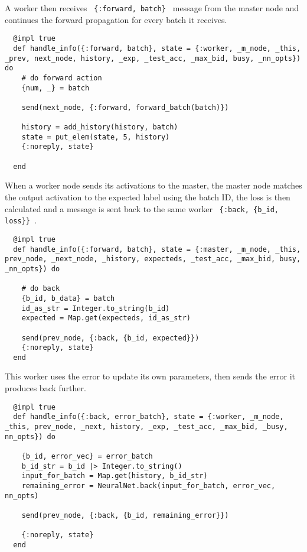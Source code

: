 A worker then receives \lstinline| {:forward, batch} | message from the master
node and continues the forward propagation for every batch it receives.
\begin{lstlisting}
  @impl true
  def handle_info({:forward, batch}, state = {:worker, _m_node, _this, _prev, next_node, history, _exp, _test_acc, _max_bid, busy, _nn_opts}) do
    # do forward action
    {num, _} = batch

    send(next_node, {:forward, forward_batch(batch)})

    history = add_history(history, batch)
    state = put_elem(state, 5, history)
    {:noreply, state}

  end
\end{lstlisting}

When a worker node sends its activations to the master, the master node matches
the output activation to the expected label using the batch ID, the loss is then
calculated and a message is sent back to the same worker \lstinline| {:back, {b_id, loss}} |.
\begin{lstlisting}
  @impl true
  def handle_info({:forward, batch}, state = {:master, _m_node, _this, prev_node, _next_node, _history, expecteds, _test_acc, _max_bid, busy, _nn_opts}) do

    # do back
    {b_id, b_data} = batch
    id_as_str = Integer.to_string(b_id)
    expected = Map.get(expecteds, id_as_str)

    send(prev_node, {:back, {b_id, expected}})
    {:noreply, state}
  end
\end{lstlisting}

This worker uses the error to update its own parameters, then
sends the error it produces back further.
\begin{lstlisting}
  @impl true
  def handle_info({:back, error_batch}, state = {:worker, _m_node, _this, prev_node, _next, history, _exp, _test_acc, _max_bid, _busy, nn_opts}) do

    {b_id, error_vec} = error_batch
    b_id_str = b_id |> Integer.to_string()
    input_for_batch = Map.get(history, b_id_str)
    remaining_error = NeuralNet.back(input_for_batch, error_vec, nn_opts)

    send(prev_node, {:back, {b_id, remaining_error}})

    {:noreply, state}
  end
\end{lstlisting}

